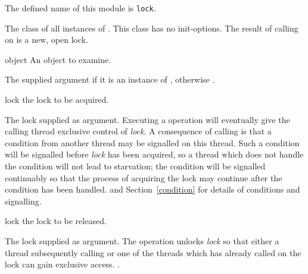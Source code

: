 \begin{optDefinition}
\label{lock}
\gdef\module{lock}
The defined name of this module is {\tt lock}.

%
The class of all instances of .  This class has no
init-options.  The result of calling  on 
is a new, open lock.

%
\begin{arguments}
    \item[object] An object to examine.
\end{arguments}
%
\result%
The supplied argument if it is an instance of ,
otherwise \nil.

%
\begin{arguments}
    \item[lock] the lock to be acquired.
\end{arguments}
%
\result%
The lock supplied as argument.
%
\remarks%
Executing a  operation will eventually give the
calling thread exclusive control of {\em lock}.  A consequence of
calling  is that a condition from another thread may be
signalled on this thread.  Such a condition will be signalled before
{\em lock} has been acquired, so a thread which does not handle the
condition will not lead to starvation; the condition will be signalled
continuably so that the process of acquiring the lock may continue
after the condition has been handled.
%
\seealso%
 and Section~\ref{condition} for details of conditions and
signalling.

%
\begin{arguments}
    \item[lock] the lock to be released.
\end{arguments}
%
\result%
The lock supplied as argument.
%
\remarks%
The  operation unlocks {\em lock} so that either a thread
subsequently calling  or one of the threads which has
already called  on the lock can gain exclusive access.
%
\seealso%
.
%
\end{optDefinition}
